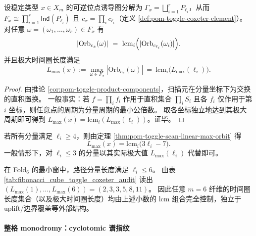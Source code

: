 \begin{theorem}\label{thm:pom-toggle-scan-lcm-tensorization}
设稳定类型 \(x\in X_m\) 的可逆位点诱导图分解为 \(\Gamma_x=\bigsqcup_{i=1}^r P_{\ell_i}\)，从而
\(
F_x\cong \prod_{i=1}^r \mathsf{Ind}(P_{\ell_i})
\)
且 \(c_x=\prod_i c_{\ell_i}\)（定义 \ref{def:pom-toggle-coxeter-element}）。
对任意 \(\omega=(\omega_1,\dots,\omega_r)\in F_x\) 有
\[
|\mathrm{Orb}_{c_x}(\omega)|
\ =\
\mathrm{lcm}_{i}\Bigl(|\mathrm{Orb}_{c_{\ell_i}}(\omega_i)|\Bigr).
\]
并且极大时间圈长度满足
\[
L_{\max}(x):=\max_{\omega\in F_x} |\mathrm{Orb}_{c_x}(\omega)|
\ =\
\mathrm{lcm}_{i}\bigl(L_{\max}(\ell_i)\bigr).
\]
\end{theorem}
\begin{proof}
由推论 \ref{cor:pom-toggle-product-components}，扫描元在分量坐标下为交换的直积置换。
一般事实：若 \(f=\prod_i f_i\) 作用于直积集合 \(\prod_i S_i\) 且各 \(f_i\) 仅作用于第 \(i\) 坐标，则任意点的周期为分量周期的最小公倍数。
取各坐标独立地达到其极大周期即可得到 \(L_{\max}(x)=\mathrm{lcm}_i(L_{\max}(\ell_i))\)。证毕。
\end{proof}

\begin{corollary}[极大时间圈的算术组合律]\label{cor:pom-toggle-scan-max-orbit-arithmetic}
若所有分量满足 \(\ell_i\ge 4\)，则由定理 \ref{thm:pom-toggle-scan-linear-max-orbit} 得
\[
L_{\max}(x)=\mathrm{lcm}_{i}\bigl(3\ell_i-7\bigr).
\]
一般情形下，对 \(\ell_i\le 3\) 的分量以其实际极大值 \(L_{\max}(\ell_i)\) 代替即可。
\end{corollary}

\begin{remark}\label{rem:pom-toggle-fold6-lmax}
在 Fold\(_6\) 的最小窗中，路径分量长度满足 \(\ell_i\le 6\)。
由表 \ref{tab:fibonacci_cube_toggle_coxeter_audit} 读出
\(
(L_{\max}(1),\dots,L_{\max}(6))=(2,3,3,5,8,11)
\)。
因此任意 \(m=6\) 纤维的时间圈长度集合（以及极大时间圈长度）均由上述小数的 \(\mathrm{lcm}\) 组合完全控制，独立于 uplift/边界覆盖等外部结构。
\end{remark}



\paragraph{整格 monodromy：cyclotomic 谱指纹}


